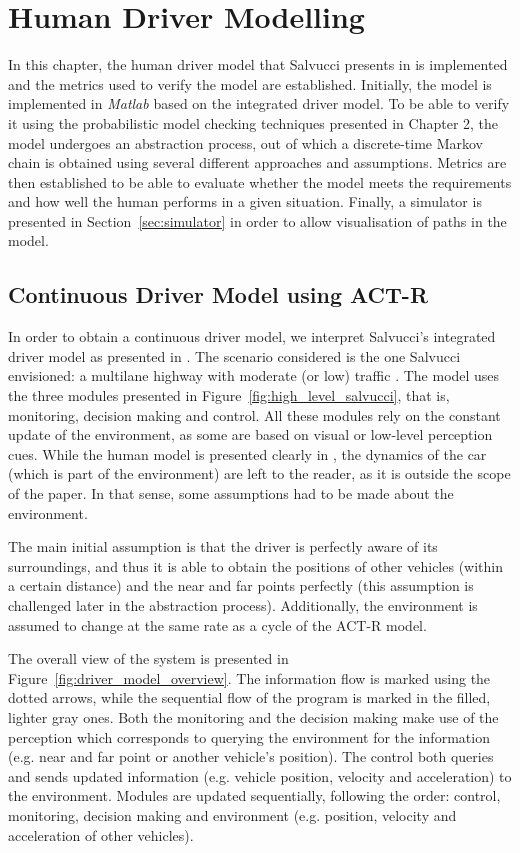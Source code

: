 \chapter{Human Driver Modelling}
\label{sec:human_driver}

In this chapter, the human driver model that Salvucci presents in \cite{salvucci_1} is implemented and the metrics used to verify the model are established. Initially, the model is implemented in \textit{Matlab} based on the integrated driver model. To be able to verify it using the probabilistic model checking techniques presented in Chapter 2, the model undergoes an abstraction process, out of which a discrete-time Markov chain is obtained using several different approaches and assumptions. Metrics are then established to be able to evaluate whether the model meets the requirements and how well the human performs in a given situation. Finally, a simulator is presented in Section~\ref{sec:simulator} in order to allow visualisation of paths in the model.

\section{Continuous Driver Model using ACT-R}

In order to obtain a continuous driver model, we interpret Salvucci's integrated driver model as presented in \cite{salvucci_1}. The scenario considered is the one Salvucci envisioned: a multilane highway with moderate (or low) traffic \cite{salvucci_1}. The model uses the three modules presented in Figure~\ref{fig:high_level_salvucci}, that is, monitoring, decision making and control. All these modules rely on the constant update of the environment, as some are based on visual or low-level perception cues. While the human model is presented clearly in \cite{salvucci_1}, the dynamics of the car (which is part of the environment) are left to the reader, as it is outside the scope of the paper. In that sense, some assumptions had to be made about the environment.

The main initial assumption is that the driver is perfectly aware of its surroundings, and thus it is able to obtain the positions of other vehicles (within a certain distance) and the near and far points perfectly (this assumption is challenged later in the abstraction process). Additionally, the environment is assumed to change at the same rate as a cycle of the ACT-R model.

The overall view of the system is presented in Figure~\ref{fig:driver_model_overview}. The information flow is marked using the dotted arrows, while the sequential flow of the program is marked in the filled, lighter gray ones. Both the monitoring and the decision making make use of the perception which corresponds to querying the environment for the information (e.g. near and far point or another vehicle's position). The control both queries and sends updated information (e.g. vehicle position, velocity and acceleration) to the environment. Modules are updated sequentially, following the order: control, monitoring, decision making and environment (e.g. position, velocity and acceleration of other vehicles).

